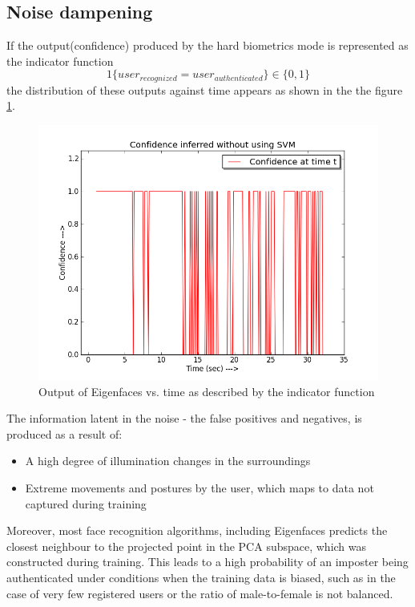 \documentclass[%
        final,
        notitlepage,
        narroweqnarray,
        inline,
        ]{ieee}
\begin{document}
\subsection{Noise dampening}
If the output(confidence) produced by the hard biometrics mode is represented as the indicator function
\begin{equation}
1\{user_{recognized} = user_{authenticated}\} \in \{0,1\}
\end{equation}
the distribution of these outputs against time appears as shown in the the figure \ref{fig:no_svm}.
\begin{figure}[h!]
	\centering
	\includegraphics[scale=0.4]{img/no_svm.png}
	\caption{Output of Eigenfaces vs. time as described by the indicator function}
	\label{fig:no_svm}
\end{figure}
The information latent in the noise - the false positives and negatives, is produced as a result of:
\begin{itemize}
	\item A high degree of illumination changes in the surroundings
	\item Extreme movements and postures by the user, which maps to data not captured during training
\end{itemize}
Moreover, most face recognition algorithms, including Eigenfaces predicts the closest neighbour to the projected point in the PCA subspace, which was constructed during training.
This leads to a high probability of an imposter being authenticated under conditions when the training data is biased, such as in the case of very few registered users or the ratio of male-to-female is not balanced.\\
\end{document}
